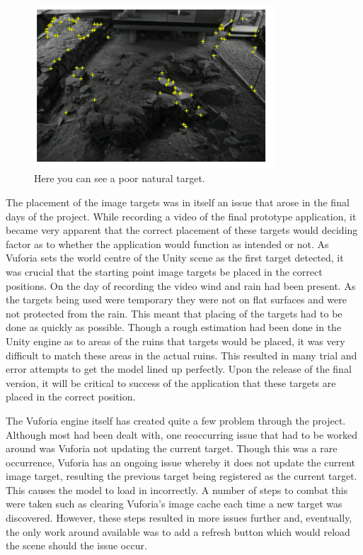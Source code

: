 \begin{figure}[ht!]
	\centering
	\includegraphics[width=90mm]{badTarget}
	\caption{Here you can see a poor natural target.
		\label{overflow}}
\end{figure}
The placement of the image targets was in itself an issue that arose in the final days of the project. While recording a video of the final prototype application, it became very apparent that the correct placement of these targets would deciding factor as to whether the application would function as intended or not. As Vuforia sets the world centre of the Unity scene as the first target detected, it was crucial that the starting point image targets be placed in the correct positions. On the day of recording the video wind and rain had been present. As the targets being used were temporary they were not on flat surfaces and were not protected from the rain. This meant that placing of the targets had to be done as quickly as possible. Though a rough estimation had been done in the Unity engine as to areas of the ruins that targets would be placed, it was very difficult to match these areas in the actual ruins. This resulted in many trial and error attempts to get the model lined up perfectly. Upon the release of the final version, it will be critical to success of the application that these targets are placed in the correct position.

The Vuforia engine itself has created quite a few problem through the project. Although most had been dealt with, one reoccurring issue that had to be worked around was Vuforia not updating the current target. Though this was a rare occurrence, Vuforia has an ongoing issue whereby it does not update the current image target, resulting the previous target being registered as the current target. This causes the model to load in incorrectly. A number of steps to combat this were taken such as clearing Vuforia's image cache each time a new target was discovered. However, these steps resulted in more issues further and, eventually, the only work around available was to add a refresh button which would reload the scene should the issue occur.

